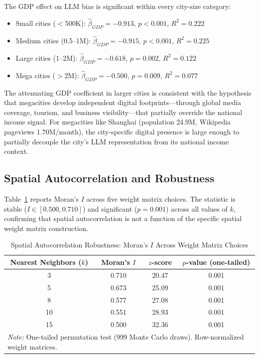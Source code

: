 \documentclass[12pt]{article}
\begin{document}
The GDP effect on LLM bias is significant within every city-size category:
\begin{itemize}
    \item Small cities ($<$500K): $\hat{\beta}_{GDP} = -0.913$, $p < 0.001$, $R^2 = 0.222$
    \item Medium cities (0.5--1M): $\hat{\beta}_{GDP} = -0.915$, $p < 0.001$, $R^2 = 0.225$
    \item Large cities (1--2M): $\hat{\beta}_{GDP} = -0.618$, $p = 0.002$, $R^2 = 0.122$
    \item Mega cities ($>$2M): $\hat{\beta}_{GDP} = -0.500$, $p = 0.009$, $R^2 = 0.077$
\end{itemize}
The attenuating GDP coefficient in larger cities is consistent with the hypothesis that megacities develop independent digital footprints---through global media coverage, tourism, and business visibility---that partially override the national income signal. For megacities like Shanghai (population 24.9M, Wikipedia pageviews 1.70M/month), the city-specific digital presence is large enough to partially decouple the city's LLM representation from its national income context.

\subsection{Spatial Autocorrelation and Robustness}

Table~\ref{tab:spatial_robustness} reports Moran's $I$ across five weight matrix choices. The statistic is stable ($I \in [0.500, 0.710]$) and significant ($p = 0.001$) across all values of $k$, confirming that spatial autocorrelation is not a function of the specific spatial weight matrix construction.

\begin{table}[htbp]
\caption{Spatial Autocorrelation Robustness: Moran's $I$ Across Weight Matrix Choices}
\label{tab:spatial_robustness}
\centering
\begin{tabular}{cccc}
\toprule
Nearest Neighbors ($k$) & Moran's $I$ & $z$-score & $p$-value (one-tailed) \\
\midrule
3  & 0.710 & 20.47 & 0.001 \\
5  & 0.673 & 25.09 & 0.001 \\
8  & 0.577 & 27.08 & 0.001 \\
10 & 0.551 & 28.93 & 0.001 \\
15 & 0.500 & 32.36 & 0.001 \\
\bottomrule
\multicolumn{4}{l}{\textit{Note:} One-tailed permutation test (999 Monte Carlo draws). Row-normalized weight matrices.} \\
\end{tabular}
\end{table}
\end{document}

